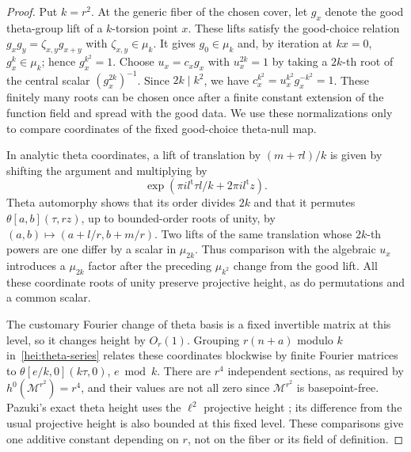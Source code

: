 \begin{proof}
Put $k=r^2$.  At the generic fiber of the chosen cover, let $g_x$
denote the good theta-group lift of a $k$-torsion point $x$.  These
lifts satisfy the good-choice relation $g_xg_y=\zeta_{x,y}g_{x+y}$ with
$\zeta_{x,y}\in\mu_k$.  It gives $g_0\in\mu_k$ and, by iteration at
$kx=0$, $g_x^k\in\mu_k$; hence $g_x^{k^2}=1$.  Choose $u_x=c_xg_x$
with $u_x^{2k}=1$ by taking a $2k$-th root of the central scalar
$(g_x^{2k})^{-1}$.  Since $2k\mid k^2$, we have
$c_x^{k^2}=u_x^{k^2}g_x^{-k^2}=1$.  These finitely many roots can be
chosen once after a finite constant extension of the function field
and spread with the good data.  We use these normalizations only to
compare coordinates of the fixed good-choice theta-null map.

In analytic theta coordinates, a lift of translation by
$(m+\tau l)/k$ is given by shifting the argument and multiplying by
\[
          \exp(\pi i l^{\mathrm t}\tau l/k+2\pi i l^{\mathrm t}z).
\]
Theta automorphy shows that its order divides $2k$ and that it permutes
$\theta[a,b](\tau,rz)$, up to bounded-order roots of unity, by
$(a,b)\mapsto(a+l/r,b+m/r)$.  Two lifts of the same translation whose
$2k$-th powers are one differ by a scalar in $\mu_{2k}$.  Thus
comparison with the algebraic $u_x$ introduces a $\mu_{2k}$ factor
after the preceding $\mu_{k^2}$ change from the good lift.  All these
coordinate roots of unity preserve projective height, as do
permutations and a common scalar.

The customary Fourier change of theta basis is a fixed invertible
matrix at this level, so it changes height by $O_r(1)$.  Grouping
$r(n+a)$ modulo $k$ in~\eqref{hei:theta-series} relates these
coordinates blockwise by finite Fourier matrices to
$\theta[e/k,0](k\tau,0)$, $e\bmod k$.  There are $r^4$ independent
sections, as required by $h^0(\mathcal M^{r^2})=r^4$, and their
values are not all zero since $\mathcal M^{r^2}$ is basepoint-free.
Pazuki's exact theta height uses the $\ell^2$ projective height
\cite[Definition 2.6]{Pazuki2012}; its difference from the usual
projective height is also bounded at this fixed level.  These
comparisons give one additive constant depending on $r$, not on the
fiber or its field of definition.


\end{proof}
